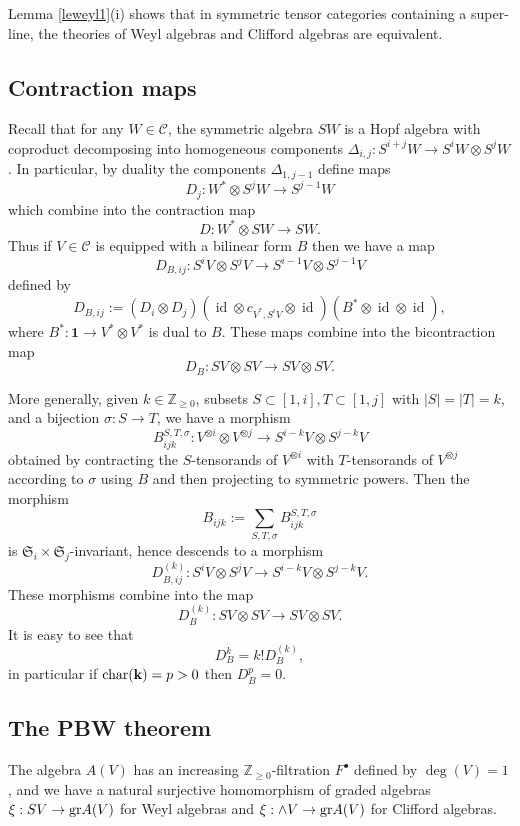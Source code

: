 \documentclass[12pt]{amsart}
\numberwithin{equation}{section}
\providecommand{\k}{}\renewcommand{\k}{\mathbf{k}}
\providecommand{\C}{}\renewcommand{\C}{\mathcal{C}}
\providecommand{\id}{}\renewcommand{\id}{\operatorname{id}}
\theoremstyle{plain}
\theoremstyle{definition}
\theoremstyle{remark}
\begin{document}
Lemma \ref{leweyl1}(i) shows that in symmetric tensor categories containing a super-line, the theories of Weyl algebras and Clifford algebras are equivalent. 

\subsection{Contraction maps} 

Recall that for any $W\in \C$, the symmetric algebra $SW$ is a Hopf algebra with coproduct 
decomposing into homogeneous components $\Delta_{i,j}: S^{i+j}W\to S^iW\otimes S^jW$. 
In particular, by duality the components $\Delta_{1,j-1}$ define maps 
$$
D_j: W^*\otimes S^jW\to S^{j-1}W
$$ 
which combine into the contraction map 
$$
D: W^*\otimes SW\to SW.
$$ 
Thus if $V\in \C$ is equipped with a bilinear form $B$ then we have a map 
$$
D_{B,ij}: S^iV\otimes S^jV\to S^{i-1}V\otimes S^{j-1}V
$$
defined by 
$$
D_{B,ij}:=(D_i\otimes D_j)(\id\otimes c_{V^*,S^iV}\otimes \id)(B^*\otimes \id\otimes \id),
$$
where $B^*: \mathbf{1}\to V^*\otimes V^*$ is dual to $B$. 
These maps 
combine into the bicontraction map
$$
D_B: SV\otimes SV\to SV\otimes SV.
$$  

More generally, given $k\in \mathbb Z_{\ge 0}$, subsets $S\subset [1,i],T\subset [1,j]$ with 
$|S|=|T|=k$, and a bijection $\sigma: S\to T$, we have 
a morphism 
$$
B^{S,T,\sigma}_{ijk}: V^{\otimes i}\otimes V^{\otimes j}\to S^{i-k}V\otimes S^{j-k}V
$$
obtained by contracting the $S$-tensorands of $V^{\otimes i}$ with $T$-tensorands 
of $V^{\otimes j}$ according to $\sigma$ using $B$ and then projecting to symmetric powers. 
Then the morphism 
$$
B_{ijk}:=\sum_{S,T,\sigma} B^{S,T,\sigma}_{ijk}
$$
is $\mathfrak S_i\times \mathfrak S_j$-invariant, hence descends to a morphism 
$$
D_{B,ij}^{(k)}: S^iV\otimes S^jV\to S^{i-k}V\otimes S^{j-k}V.
$$ 
These morphisms combine into the map 
$$
D_B^{(k)}: SV\otimes SV\to SV\otimes SV.
$$ 
It is easy to see that 
$$
D_B^k=k! D_B^{(k)},
$$
in particular if ${\rm char}(\k)=p>0$ then $D_B^p=0$. 

\subsection{The PBW theorem}
The algebra $A(V)$ has an increasing $\mathbb Z_{\ge 0}$-filtration $F^\bullet$ defined by $\deg(V)=1$, and we have a natural surjective  homomorphism of graded algebras
$\xi: SV\to {\rm gr}A(V)$ for Weyl algebras and $\xi: \wedge V\to {\rm gr}A(V)$ for Clifford algebras. 
\end{document}
